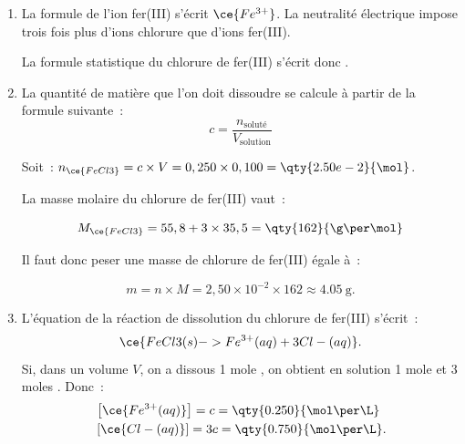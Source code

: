 \begin{enumerate}
    \item La formule de l'ion fer(III) s'écrit $\ce{Fe^{3+}}$. La neutralité
          électrique impose trois fois plus d'ions chlorure que d'ions fer(III).

          La formule statistique du chlorure de fer(III) s'écrit donc
          .
    \item La quantité de matière que l'on doit dissoudre se calcule à partir de
          la formule suivante~:
          \[
              c=\frac{n_{\text{soluté}}}{V_{\text{solution}}}
          \]

          Soit~:
          $n_{\ce{FeCl3}}=c\times V=0,250\times0,100=\qty{2.50e-2}{\mol}$.
    
          La masse molaire du chlorure de fer(III) vaut~:

          \[
              M_{\ce{FeCl3}}=55,8+3\times35,5=\qty{162}{\g\per\mol}
          \]

          Il faut donc peser une masse de chlorure de fer(III) égale à~:

          \[
              m=n\times M=2,50\times 10^{-2}\times 162\approx\qty{4.05}{\g}.
          \]

    \item L'équation de la réaction de dissolution du chlorure de fer(III)
          s'écrit~:
          \[
              \ce{FeCl3(s) -> Fe^{3+}(aq) + 3Cl-(aq)}.
          \]
          Si, dans un volume $V$, on a dissous 1 mole , on obtient
          en solution 1 mole  et 3 moles . Donc~:
          \begin{align*}
              &\left[\ce{Fe^{3+}(aq)}\right]=c=\qty{0.250}{\mol\per\L} \\
              &\left[\ce{Cl-(aq)}\right]=3c=\qty{0.750}{\mol\per\L}.
          \end{align*}
\end{enumerate}



